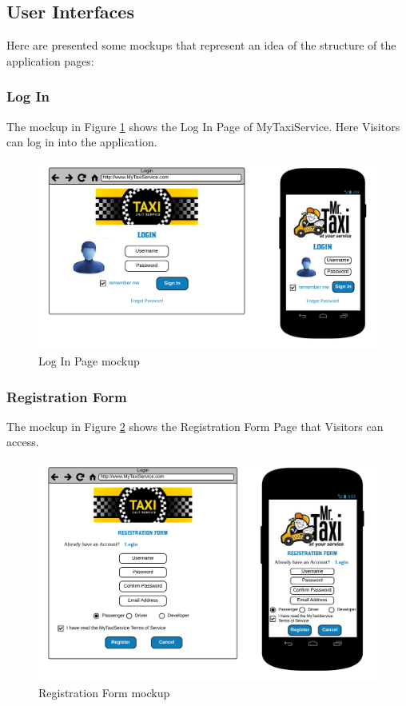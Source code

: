 \subsection{User Interfaces}
Here are presented some mockups that represent an idea of the structure of the application pages:

\subsubsection{Log In}
The mockup in Figure \ref{fig:login} shows the Log In Page of MyTaxiService. Here Visitors can log in into the application.

\begin{figure}[htbp]
\centering
\includegraphics[width=\textwidth]{cpt/img/Login}
\caption{Log In Page mockup}
\label{fig:login}
\end{figure}
\clearpage

\subsubsection{Registration Form}
The mockup in Figure \ref{fig:regform} shows the Registration Form Page that Visitors can access.

\begin{figure}[htbp]
\centering
\includegraphics[width=\textwidth]{cpt/img/RegForm}
\caption{Registration Form mockup}
\label{fig:regform}
\end{figure}
\clearpage

